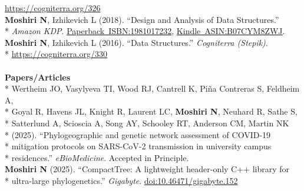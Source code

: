 \documentclass[margin,line]{res}
\begin{document}
\begin{resume}
\hspace*{8mm} \href{https://cogniterra.org/326}{https://cogniterra.org/326}\\
\hspace*{4mm} \textbf{Moshiri N}, Izhikevich L (2018). ``Design and Analysis of Data Structures.''\\*\vspace{2mm}
\hspace*{8mm} \textit{Amazon KDP}. \href{https://www.amazon.com/dp/1981017232}{Paperback~ISBN:1981017232}, \href{https://www.amazon.com/dp/B07CYM8ZWJ}{Kindle~ASIN:B07CYM8ZWJ}.\\
\hspace*{4mm} \textbf{Moshiri N}, Izhikevich L (2016). ``Data Structures.'' \textit{Cogniterra (Stepik)}.\\*\vspace{2mm}
\hspace*{8mm} \href{https://cogniterra.org/330}{https://cogniterra.org/330}\\
~\\
\textbf{Papers/Articles}\vspace{2mm}\\*
\hspace*{4mm} Wertheim JO, Vasylyeva TI, Wood RJ, Cantrell K, Pi{\~n}a Contreras S, Feldheim A,\\*
\hspace*{9mm} Goyal R, Havens JL, Knight R, Laurent LC, \textbf{Moshiri N}, Neuhard R, Sathe S,\\*
\hspace*{9mm} Satterlund A, Scioscia A, Song AY, Schooley RT, Anderson CM, Martin NK\\*
\hspace*{9mm} (2025). ``Phylogeographic and genetic network assessment of COVID-19\\*
\hspace*{9mm} mitigation protocols on SARS-CoV-2 transmission in university campus\\*\vspace{2mm}
\hspace*{8mm} residences.'' \textit{eBioMedicine}. Accepted in Principle.\\
\hspace*{4mm} \textbf{Moshiri N} (2025). ``CompactTree: A lightweight header-only C++ library for\\*\vspace{2mm}
\hspace*{8mm} ultra-large phylogenetics.'' \textit{Gigabyte}. \href{https://doi.org/10.46471/gigabyte.152}{doi:10.46471/gigabyte.152}\\

\end{resume}
\end{document}
